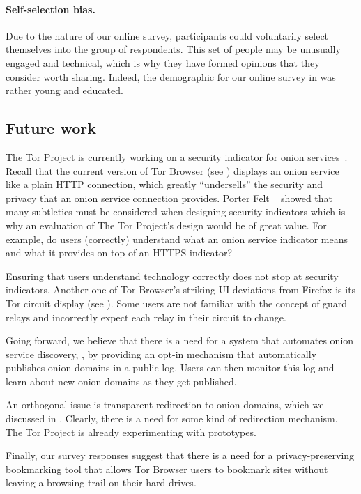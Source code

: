 \paragraph{Self-selection bias.}
Due to the nature of our online survey, participants could voluntarily select
themselves into the group of respondents.  This set of people may be unusually
engaged and technical, which is why they have formed opinions that they
consider worth sharing.  Indeed, the demographic for our online survey in
 was rather young and educated.

\subsection{Future work}
\label{sec:future-work}

The Tor Project is currently working on a security indicator for onion
services~\cite{trac23247}.  Recall that the current version of Tor Browser (see
) displays an onion service like a plain HTTP
connection, which greatly ``undersells'' the security and privacy that an onion
service connection provides.  Porter Felt \ea~\cite{Felt2016a} showed that many
subtleties must be considered when designing security indicators which is why an
evaluation of The Tor Project's design would be of great value.  For example, do
users (correctly) understand what an onion service indicator means and what it
provides on top of an HTTPS indicator?

Ensuring that users understand technology correctly does not stop at security
indicators.  Another one of Tor Browser's striking UI deviations from Firefox is
its Tor circuit display (see ).  Some users are not
familiar with the concept of guard relays and incorrectly expect each relay in
their circuit to change.

Going forward, we believe that there is a need for a system that automates onion
service discovery, \eg, by providing an opt-in mechanism that automatically
publishes onion domains in a public log.  Users can then monitor this log and
learn about new onion domains as they get published.

An orthogonal issue is transparent redirection to onion domains, which we
discussed in .  Clearly, there is a need for some
kind of redirection mechanism.  The Tor Project is already experimenting with
prototypes.

Finally, our survey responses suggest that there is a need for a
privacy-preserving bookmarking tool that allows Tor Browser users to bookmark
sites without leaving a browsing trail on their hard drives.
